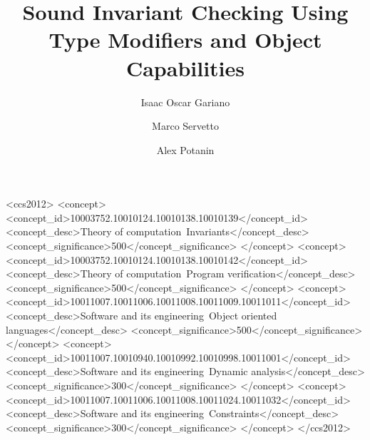 \documentclass[english,submission,code=tt]{programming}
\theoremstyle{plain}
\begin{document}
\title{%
Sound Invariant Checking Using Type Modifiers and Object Capabilities
}
\author{Isaac Oscar Gariano}
\author{Marco Servetto}
\author{Alex Potanin}



\begin{CCSXML}
<ccs2012>
	<concept>
		<concept_id>10003752.10010124.10010138.10010139</concept_id>
		<concept_desc>Theory of computation~Invariants</concept_desc>
		<concept_significance>500</concept_significance>
	</concept>
	<concept>
		<concept_id>10003752.10010124.10010138.10010142</concept_id>
		<concept_desc>Theory of computation~Program verification</concept_desc>
		<concept_significance>500</concept_significance>
	</concept>
	<concept>
		<concept_id>10011007.10011006.10011008.10011009.10011011</concept_id>
		<concept_desc>Software and its engineering~Object oriented languages</concept_desc>
		<concept_significance>500</concept_significance>
	</concept>
	<concept>
		<concept_id>10011007.10010940.10010992.10010998.10011001</concept_id>
		<concept_desc>Software and its engineering~Dynamic analysis</concept_desc>
		<concept_significance>300</concept_significance>
	</concept>
	<concept>
		<concept_id>10011007.10011006.10011008.10011024.10011032</concept_id>
		<concept_desc>Software and its engineering~Constraints</concept_desc>
		<concept_significance>300</concept_significance>
	</concept>
</ccs2012>
\end{CCSXML}

\end{document}
